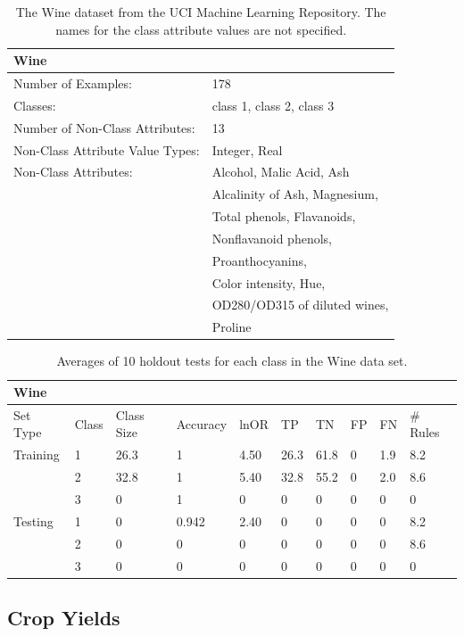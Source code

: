\documentclass[11pt]{article}
\begin{document}
\begin{table}
\begin{tabularx}{\textwidth}{ll}
\toprule
\textbf{Wine} & \\
\midrule
Number of Examples: & 178 \\
Classes: & class 1, class 2, class 3 \\
Number of Non-Class Attributes: & 13 \\
Non-Class Attribute Value Types: & Integer, Real \\
Non-Class Attributes: & Alcohol, Malic Acid, Ash \\ & Alcalinity of Ash, Magnesium, \\
& Total phenols, Flavanoids, \\
& Nonflavanoid phenols, \\
& Proanthocyanins, \\
& Color intensity, Hue, \\
& OD280/OD315 of diluted wines, \\
& Proline \\
\bottomrule
\end{tabularx}
\caption{The Wine dataset from the UCI Machine Learning Repository. The names for the class attribute values are not specified.}
\label{wine_info}
\end{table}

\begin{table}
\centering
\begin{tabular}{llllllllll}
\toprule
\textbf{Wine} & & & & & & & & & \\
\midrule
Set Type & Class & Class Size & Accuracy & lnOR & TP & TN & FP & FN & \# Rules \\
\midrule
Training & 1 & 26.3 & 1 & 4.50 & 26.3 & 61.8 & 0 & 1.9 & 8.2 \\
& 2 & 32.8 & 1 & 5.40 & 32.8 & 55.2 & 0 & 2.0 & 8.6 \\
& 3 & 0 & 1 & 0 & 0 & 0 & 0 & 0 & 0 \\
Testing & 1 & 0 & 0.942 & 2.40 & 0 & 0 & 0 & 0 & 8.2 \\
& 2 & 0 & 0 & 0 & 0 & 0 & 0 & 0 & 8.6 \\
& 3 & 0 & 0 & 0 & 0 & 0 & 0 & 0 & 0 \\
\bottomrule
\end{tabular}
\caption{Averages of 10 holdout tests for each class in the Wine data set.}
\label{wine_results}
\end{table}

\subsection{Crop Yields}


\end{document}
